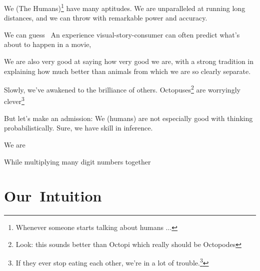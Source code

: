 









We (The Humans)\footnote{Whenever someone starts talking about humans ...}
have many aptitudes.
We are unparalleled at running long distances,
and we can throw with remarkable power and accuracy.


We can guess~\cite{FACES,deceptionpaper}
An experience visual-story-consumer can 
often predict what's about to happen in a movie,

We are also very good at saying how very good we are,
with a strong tradition in explaining how 
much better than animals from which we are so clearly separate.

Slowly, we've awakened to the brilliance of others.
Octopuses\footnote{Look: this sounds better than Octopi which really should
  be Octopodes} are worryingly clever\footnote{If they ever stop
  eating each other, we're in a lot of trouble.\footnote{Possibly what
the dinosaurs said about mammals}}

But let's make an admission: We (humans) are not especially
good with thinking probabilistically.
Sure, we have skill in inference.




We are 



While multiplying many digit numbers together

\section{Our\ Intuition}

